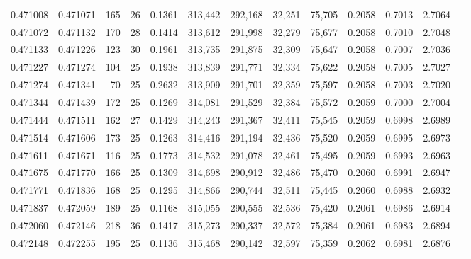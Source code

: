 \begin{tabular}{rrrrrrrrrrrrr}
0.471008 & 0.471071 & 165 &  26 &                                     0.1361 & 313,442 & 292,168 &  32,251 &  75,705 & 0.2058 & 0.7013 & 2.7064 \\
0.471072 & 0.471132 & 170 &  28 &                                     0.1414 & 313,612 & 291,998 &  32,279 &  75,677 & 0.2058 & 0.7010 & 2.7048 \\
0.471133 & 0.471226 & 123 &  30 &                                     0.1961 & 313,735 & 291,875 &  32,309 &  75,647 & 0.2058 & 0.7007 & 2.7036 \\
0.471227 & 0.471274 & 104 &  25 &                                     0.1938 & 313,839 & 291,771 &  32,334 &  75,622 & 0.2058 & 0.7005 & 2.7027 \\
0.471274 & 0.471341 &  70 &  25 &                                     0.2632 & 313,909 & 291,701 &  32,359 &  75,597 & 0.2058 & 0.7003 & 2.7020 \\
0.471344 & 0.471439 & 172 &  25 &                                     0.1269 & 314,081 & 291,529 &  32,384 &  75,572 & 0.2059 & 0.7000 & 2.7004 \\
0.471444 & 0.471511 & 162 &  27 &                                     0.1429 & 314,243 & 291,367 &  32,411 &  75,545 & 0.2059 & 0.6998 & 2.6989 \\
0.471514 & 0.471606 & 173 &  25 &                                     0.1263 & 314,416 & 291,194 &  32,436 &  75,520 & 0.2059 & 0.6995 & 2.6973 \\
0.471611 & 0.471671 & 116 &  25 &                                     0.1773 & 314,532 & 291,078 &  32,461 &  75,495 & 0.2059 & 0.6993 & 2.6963 \\
0.471675 & 0.471770 & 166 &  25 &                                     0.1309 & 314,698 & 290,912 &  32,486 &  75,470 & 0.2060 & 0.6991 & 2.6947 \\
0.471771 & 0.471836 & 168 &  25 &                                     0.1295 & 314,866 & 290,744 &  32,511 &  75,445 & 0.2060 & 0.6988 & 2.6932 \\
0.471837 & 0.472059 & 189 &  25 &                                     0.1168 & 315,055 & 290,555 &  32,536 &  75,420 & 0.2061 & 0.6986 & 2.6914 \\
0.472060 & 0.472146 & 218 &  36 &                                     0.1417 & 315,273 & 290,337 &  32,572 &  75,384 & 0.2061 & 0.6983 & 2.6894 \\
0.472148 & 0.472255 & 195 &  25 &                                     0.1136 & 315,468 & 290,142 &  32,597 &  75,359 & 0.2062 & 0.6981 & 2.6876 \\

\end{tabular}

